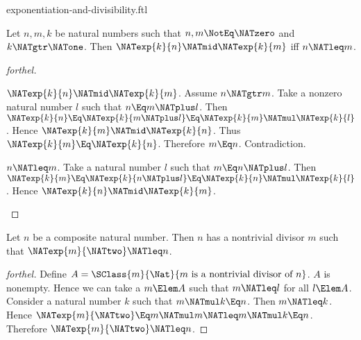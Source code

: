 \documentclass{stex}
\begin{document}
\begin{smodule}{exponentiation-and-divisibility.ftl}

\begin{proposition}[forthel]
  Let $n, m, k$ be natural numbers such that $n, m \NotEq \NATzero$ and $k \NATgtr \NATone$.
  Then $\NATexp{k}{n} \NATmid \NATexp{k}{m}$ iff $n \NATleq m$.
\end{proposition}
\begin{proof}[forthel]
  \begin{case}{$\NATexp{k}{n} \NATmid \NATexp{k}{m}$.}
    Assume $n \NATgtr m$.
    Take a nonzero natural number $l$ such that $n \Eq m \NATplus l$.
    Then $\NATexp{k}{n}
      \Eq \NATexp{k}{m \NATplus l}
      \Eq \NATexp{k}{m} \NATmul \NATexp{k}{l}$.
    Hence $\NATexp{k}{m} \NATmid \NATexp{k}{n}$.
    Thus $\NATexp{k}{m} \Eq \NATexp{k}{n}$.
    Therefore $m \Eq n$.
    Contradiction.
  \end{case}

  \begin{case}{$n \NATleq m$.}
    Take a natural number $l$ such that $m \Eq n \NATplus l$.
    Then $\NATexp{k}{m}
      \Eq \NATexp{k}{n \NATplus l}
      \Eq \NATexp{k}{n} \NATmul \NATexp{k}{l}$.
    Hence $\NATexp{k}{n} \NATmid \NATexp{k}{m}$.
  \end{case}
\end{proof}

\begin{proposition}[forthel]
  Let $n$ be a composite natural number.
  Then $n$ has a nontrivial divisor $m$ such that $\NATexp{m}{\NATtwo} \NATleq n$.
\end{proposition}
\begin{proof}[forthel]
  Define $A = \SClass{m}{\Nat}{m\text{ is a nontrivial divisor of }n}$.
  $A$ is nonempty.
  Hence we can take a $m \Elem A$ such that $m \NATleq l$ for all $l \Elem A$.
  Consider a natural number $k$ such that $m \NATmul k \Eq n$.
  Then $m \NATleq k$.
  Hence $\NATexp{m}{\NATtwo} \Eq m \NATmul m \NATleq m \NATmul k \Eq n$.
  Therefore $\NATexp{m}{\NATtwo} \NATleq n$.
\end{proof}
\end{smodule}
\end{document}
